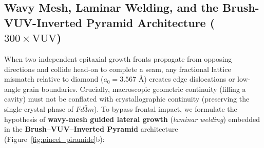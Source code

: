 \documentclass[10pt,twocolumn,a4paper]{article}
\begin{document}
\subsection{Wavy Mesh, Laminar Welding, and the Brush-VUV-Inverted Pyramid Architecture ($300\times\text{VUV}$)}
When two independent epitaxial growth fronts propagate from opposing directions and collide head-on to complete a seam, any fractional lattice mismatch relative to diamond ($a_0 = 3.567\text{ \AA}$) creates edge dislocations or low-angle grain boundaries. Crucially, macroscopic geometric continuity (filling a cavity) must not be conflated with crystallographic continuity (preserving the single-crystal phase of $Fd\bar{3}m$). To bypass frontal impact, we formulate the hypothesis of \textbf{wavy-mesh guided lateral growth} (\textit{laminar welding}) embedded in the \textbf{Brush--VUV--Inverted Pyramid} architecture (Figure~\ref{fig:pincel_piramide}b):
\end{document}
